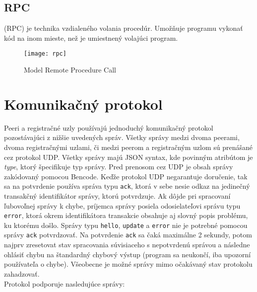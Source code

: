 \section*{RPC}

 (RPC) je technika vzdialeného volania procedúr. Umožňuje programu vykonať kód na inom mieste, než je umiestnený volajúci program.

\begin{figure}[H]
	\texttt{[image: rpc]}
	\caption{Model Remote Procedure Call}
	\label{rpcmodel}
\end{figure}


\chapter{Komunikačný protokol}

Peeri a registračné uzly používajú jednoduchý komunikačný protokol pozostávajúci z nižšie uvedených správ. Všetky správy medzi dvoma peerami, dvoma registračnými uzlami, či medzi peerom a registračným uzlom sú prenášané cez protokol UDP. Všetky správy majú JSON syntax, kde povinným atribútom je \textit{type}, ktorý špecifikuje typ správy. Pred prenosom cez UDP je obsah správy zakódovaný pomocou Bencode. Keďže protokol UDP negarantuje doručenie, tak sa na potvrdenie používa správa typu \texttt{ack}, ktorá v sebe nesie odkaz na jedinečný transakčný identifikátor správy, ktorú potvrdzuje. Ak dôjde pri spracovaní ľubovoľnej správy k chybe, príjemca správy posiela odosielateľovi správu typu \texttt{error}, ktorá okrem identifikátora transakcie obsahuje aj slovný popis problému, ku ktorému došlo. Správy typu \texttt{hello}, \texttt{update} a \texttt{error} nie je potrebné pomocou správy \texttt{ack} potvrdzovať. Na potvrdenie \texttt{ack} sa čaká maximálne 2 sekundy, potom najprv zresetovat stav spracovania súvisiaceho s nepotvrdenú správou a následne ohlásiť chybu na štandardný chybový výstup (program sa neukončí, iba upozorní používateľa o chybe). Všeobecne je možné správy mimo očakávaný stav protokolu zahadzovať. \\

\noindent Protokol podporuje nasledujúce správy:


